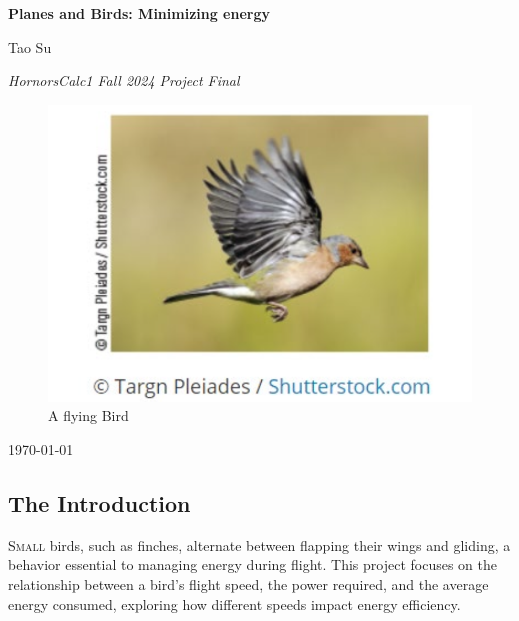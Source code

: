 \documentclass{article}
\begin{document}
\begin{titlepage}
    \centering
    \vspace*{1cm}
    
    \Huge
    \textbf{Planes and Birds: Minimizing energy}
    
    \vspace{0.5cm}
    
    \Large
    Tao Su
    \vspace{1.5cm}

    \large 
    \textit{HornorsCalc1 Fall 2024 Project Final}
    \vfill

    \begin{figure}[h]
        \centering
        \includegraphics[width=1\textwidth]{coverPage.png}
        \caption{\small A flying Bird}
        \label{fig:cover}
    \end{figure}
            
    \Large
    \today  %
    
\end{titlepage}

\newpage

\subsection*{The Introduction}

\lettrine[lines=2]{S}{mall} birds, such as finches, alternate between flapping their wings and gliding, a behavior essential to managing energy during flight. This project focuses on the relationship between a bird’s flight speed, the power required, and the average energy consumed, exploring how different speeds impact energy efficiency.
\end{document}
